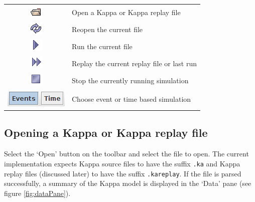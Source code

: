 \documentclass[english]{report}
\begin{document}
\begin{tabular}{cl}
 \includegraphics[scale=0.5]{./images/Open.png} & Open a Kappa or Kappa replay file \\
 \includegraphics[scale=0.5]{./images/Reopen.png} & Reopen the current file  \\
 \includegraphics[scale=0.5]{./images/Run.png} & Run the current file \\
 \includegraphics[scale=0.5]{./images/Replay.png} & Replay the current replay file or last run \\
 \includegraphics[scale=0.5]{./images/Stop.png} & Stop the currently running simulation \\
 \includegraphics[scale=0.5]{./images/EventsOrTime.png} & Choose event or time based simulation \\
\end{tabular}

\subsection{Opening a Kappa or Kappa replay file}

Select the `Open' button on the toolbar and select the file to open. The current implementation expects Kappa source files to have the suffix \verb|.ka| and Kappa replay files (discussed later) to have the suffix \verb|.kareplay|. If the file is parsed successfully, a summary of the Kappa model is displayed in the `Data' pane (see figure \ref{fig:dataPane}). 
\end{document}
